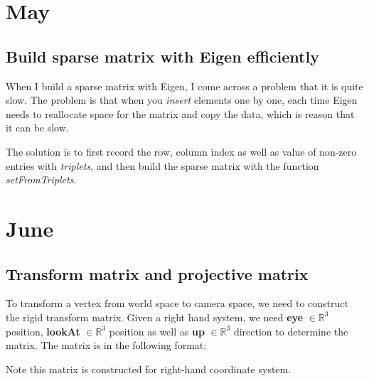 \chapter{May}

\section{Build sparse matrix with Eigen efficiently} 

When I build a sparse matrix with Eigen, I come across a problem that it is quite slow. The problem is that
when you \textit{insert} elements one by one, each time Eigen needs to reallocate space for the matrix and copy
the data, which is reason that it can be slow. 

The solution is to first record the row, column index as well as value of non-zero entries with \textit{triplets},
and then build the sparse matrix with the function \textit{setFromTriplets}.

\chapter{June}
\section{Transform matrix and projective matrix} 
To transform a vertex from world space to camera space, we need to construct the rigid transform matrix. Given a right
hand system, we need \textbf{eye} $\in \mathbb{R}^3$ position, \textbf{lookAt} $\in \mathbb{R}^3$ position as well as \textbf{up} $\in \mathbb{R}^3$ direction to determine the matrix.
The matrix is in the following format:

\begin{remark}
    Note this matrix is constructed for right-hand coordinate system.  
\end{remark}

